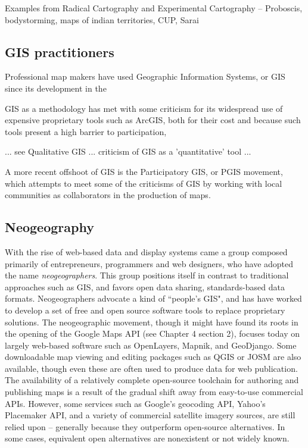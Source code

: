 \documentclass[11pt]{report}
\begin{document}
Examples from Radical Cartography and Experimental Cartography -- Proboscis, bodystorming, maps of indian territories, CUP, Sarai 

\subsection{GIS practitioners}

Professional map makers have used Geographic Information Systems, or GIS since its development in the 


GIS as a methodology has met with some criticism for its widespread use of expensive proprietary tools such as ArcGIS, both for their cost and because such tools present a high barrier to participation, 

... see Qualitative GIS ... criticism of GIS as a 'quantitative' tool ... 

A more recent offshoot of GIS is the Participatory GIS, or PGIS movement, which attempts to meet some of the criticisms of GIS by working with local communities as collaborators in the production of maps. 

\subsection{Neogeography}

With the rise of web-based data and display systems came a group composed primarily of entrepreneurs, programmers and web designers, who have adopted the name \emph{neogeographers}. This group positions itself in contrast to traditional approaches such as GIS, and favors open data sharing, standards-based data formats. Neogeographers advocate a kind of ``people's GIS", and has have worked to develop a set of free and open source software tools to replace proprietary solutions. The neogeographic movement, though it might have found its roots in the opening of the Google Maps API (see Chapter 4 section 2), focuses today on largely web-based software such as OpenLayers, Mapnik, and GeoDjango. Some downloadable map viewing and editing packages such as QGIS or JOSM are also available, though even these are often used to produce data for web publication. The availability of a relatively complete open-source toolchain for authoring and publishing maps is a result of the gradual shift away from easy-to-use commercial APIs. \cite{rana2009neogeography} However, some services such as Google's geocoding API, Yahoo's Placemaker API, and a variety of commercial satellite imagery sources, are still relied upon -- generally because they outperform open-source alternatives. In some cases, equivalent open alternatives are nonexistent or not widely known.
\end{document}
